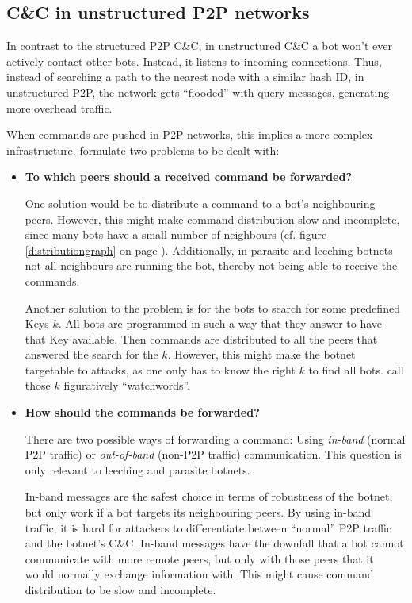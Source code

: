 \documentclass{llncs}
\begin{document}
\subsection{C\&C in unstructured P2P networks}
In contrast to the structured P2P C\&C, in unstructured C\&C a bot
won't ever actively contact other bots. Instead, it listens to
incoming connections.  \cite{li2009botnet} Thus, instead of searching
a path to the nearest node with a similar hash ID, in unstructured
P2P, the network gets ``flooded'' with query messages, generating more
overhead traffic.


When commands are pushed in P2P networks, this implies a more complex
infrastructure. \cite{wang2009systematic} formulate two problems to be dealt
with:

\begin{itemize}
\item {\bf To which peers should a received command be forwarded?}


One solution would be to distribute a command to a bot's neighbouring
peers. However, this might make command distribution slow and
incomplete, since many bots have a small number of neighbours
(cf. figure \ref{distributiongraph} on page
\pageref{distributiongraph}). Additionally, in parasite and leeching
botnets not all neighbours are running the bot, thereby not being
able to receive the commands.


Another solution to the problem is for the bots to search for some
predefined Keys $k$. All bots are programmed in such a way that they
answer to have that Key available. Then commands are distributed to
all the peers that answered the search for the $k$. However, this
might make the botnet targetable to attacks, as one only has to know
the right $k$ to find all bots. \cite{wang2009systematic} call those
$k$ figuratively ``watchwords''.

\item {\bf How should the commands be forwarded?}

There are two possible ways of forwarding a command: Using {\it
  in-band} (normal P2P traffic) or {\it out-of-band} (non-P2P traffic)
communication. This question is only relevant to leeching and
parasite botnets.

In-band messages are the safest choice in terms of robustness of the
botnet, but only work if a bot targets its neighbouring
peers\cite{wang2009systematic}. By using in-band traffic, it is hard
for attackers to differentiate between ``normal'' P2P traffic and the
botnet's C\&C. In-band messages have the downfall that a bot cannot
communicate with more remote peers, but only with those peers that it
would normally exchange information with. This might cause command
distribution to be slow and incomplete.


\end{itemize}
\end{document}
